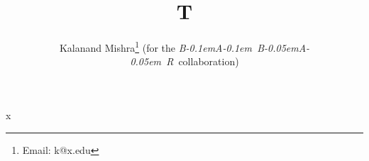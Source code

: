 \documentclass{revtex4}
\def\babar{\mbox{\slshape B\kern-0.1em{\small A}\kern-0.1em B\kern-0.05em{\small A\kern-0.05em R}}}
\begin{document}
\title{T}
\author{Kalanand Mishra\footnote{Email: k@x.edu} (for the \babar\ collaboration)}
\maketitle
x
\end{document}
